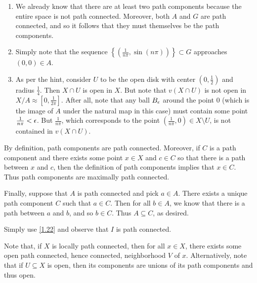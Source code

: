 \documentclass[../solutions.tex]{subfiles}
\begin{document}
\begin{exercise} \leavevmode
\begin{enumerate}
\item We already know that there are at least two path components because the entire space is not path connected. Moreover, both $A$ and $G$ are path connected, and so it follows that they must themselves be the path components. 

\item Simply note that the sequence $\left\{\left(\frac1{n\pi},\sin(n\pi)\right)\right\}\subset G$ approaches $(0,0)\in A$. 

\item As per the hint, consider $U$ to be the open disk with center $(0,\frac12)$ and radius $\frac14$. Then $X\cap U$ is open in $X$. But note that $v(X\cap U)$ is not open in $X/A\approx[0,\frac1{2\pi}]$. After all, note that any ball $B_\epsilon$ around the point 0 (which is the image of $A$ under the natural map in this case) must contain some point $\frac1{n\pi}<\epsilon$. But $\frac1{n\pi}$, which corresponds to the point $\left(\frac1{n\pi},0\right)\in X\setminus U$, is not contained in $v(X\cap U)$. 
\end{enumerate} 
\end{exercise} 

\begin{exercise} \leavevmode
By definition, path components are path connected. Moreover, if $C$ is a path component and there exists some point $x\in X$ and $c\in C$ so that there is a path between $x$ and $c$, then the definition of path components implies that $x\in C$. Thus path components are maximally path connected. 

Finally, suppose that $A$ is path connected and pick $a\in A$. There exists a unique path component $C$ such that $a\in C$. Then for all $b\in A$, we know that there is a path between $a$ and $b$, and so $b\in C$. Thus $A\subseteq C$, as desired. 
\end{exercise} 

\begin{exercise} \leavevmode
Simply use \cref{1.22} and observe that $I$ is path connected. 
\end{exercise} 

\begin{exercise} \leavevmode
Note that, if $X$ is locally path connected, then for all $x\in X$, there exists some open path connected, hence connected, neighborhood $V$ of $x$. Alternatively, note that if $U\subseteq X$ is open, then its components are unions of its path components and thus open. 
\end{exercise} 
\end{document}
